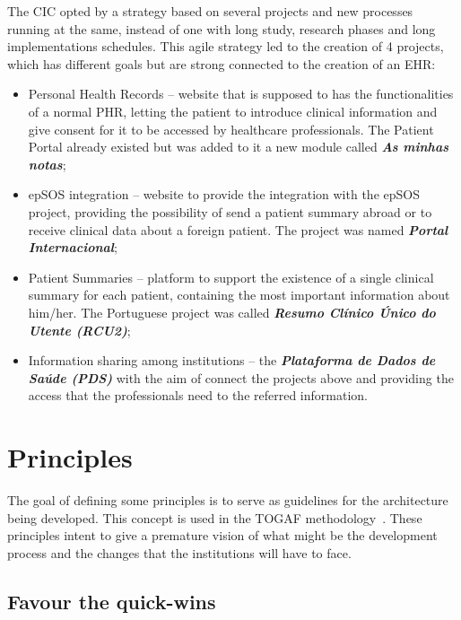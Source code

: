 The CIC opted by a strategy based on several projects and new processes running at the same, instead of one with long study, research phases and long implementations schedules. This agile strategy led to the creation of 4 projects, which has different goals but are strong connected to the creation of an EHR:

\begin{itemize}
\item Personal Health Records -- website that is supposed to has the functionalities of a normal PHR, letting the patient to introduce clinical information and give consent for it to be accessed by healthcare professionals. The Patient Portal already existed but was added to it a new module called \textit{\textbf{As minhas notas}}; 
\item epSOS integration -- website to provide the integration with the epSOS project, providing the possibility of send a patient summary abroad or to receive clinical data about a foreign patient. The project was named \textit{\textbf{Portal Internacional}};
\item Patient Summaries -- platform to support the existence of a single clinical summary for each patient, containing the most important information about him/her. The Portuguese project was called \textbf{\textit{Resumo Clínico Único do Utente (RCU2)}};
\item Information sharing among institutions -- the \textbf{\textit{Plataforma de Dados de Saúde (PDS)}} with the aim of connect the projects above and providing the access that the professionals need to the referred information.
\end{itemize}



\section{Principles}

The goal of defining some principles is to serve as guidelines for the architecture being developed. This concept is used in the TOGAF methodology~\citep{Josey2009, Josey2011}. These principles intent to give a premature vision of what might be the development process and the changes that the institutions will have to face.


\subsection{Favour the quick-wins}

